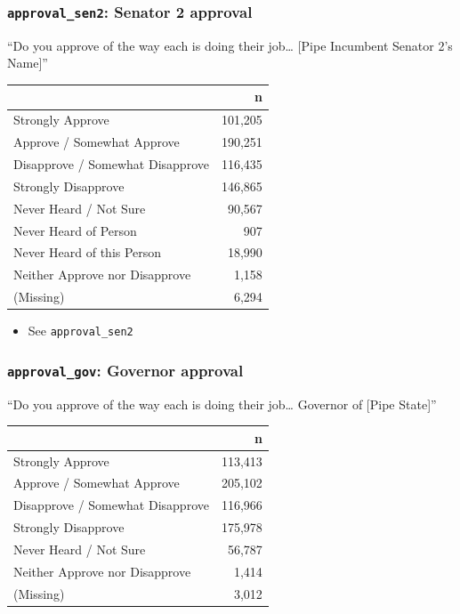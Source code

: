 \documentclass[10pt,article,oneside]{memoir}
\theoremstyle{definition}
\begin{document}
\subsubsection{\texorpdfstring{\texttt{approval\_sen2}: Senator 2
approval}{approval\_sen2: Senator 2 approval}}\label{approval_sen2-senator-2-approval}

``Do you approve of the way each is doing their job\ldots{} {[}Pipe
Incumbent Senator 2's Name{]}''

\begin{table}[H]
\centering
\begin{tabular}[t]{lr}
\toprule
 & n\\
\midrule
Strongly Approve & 101,205\\
Approve / Somewhat Approve & 190,251\\
Disapprove / Somewhat Disapprove & 116,435\\
Strongly Disapprove & 146,865\\
Never Heard / Not Sure & 90,567\\
Never Heard of Person & 907\\
Never Heard of this Person & 18,990\\
Neither Approve nor Disapprove & 1,158\\
(Missing) & 6,294\\
\bottomrule
\end{tabular}
\end{table}

\begin{itemize}
\tightlist
\item
  See \texttt{approval\_sen2}
\end{itemize}

\subsubsection{\texorpdfstring{\texttt{approval\_gov}: Governor
approval}{approval\_gov: Governor approval}}\label{approval_gov-governor-approval}

``Do you approve of the way each is doing their job\ldots{} Governor of
{[}Pipe State{]}''

\begin{table}[H]
\centering
\begin{tabular}[t]{lr}
\toprule
 & n\\
\midrule
Strongly Approve & 113,413\\
Approve / Somewhat Approve & 205,102\\
Disapprove / Somewhat Disapprove & 116,966\\
Strongly Disapprove & 175,978\\
Never Heard / Not Sure & 56,787\\
Neither Approve nor Disapprove & 1,414\\
(Missing) & 3,012\\
\bottomrule
\end{tabular}
\end{table}
\end{document}
